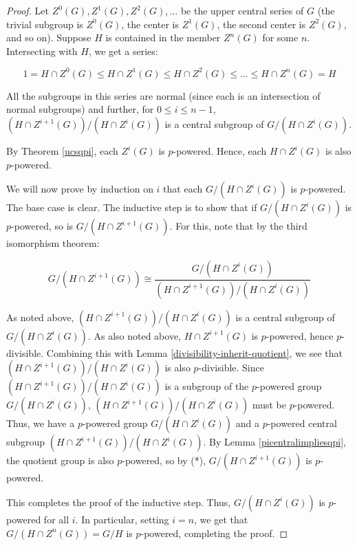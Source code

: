 \documentclass{ucetd}
\begin{document}
\begin{proof}
  Let $Z^0(G),Z^1(G),Z^2(G),\dots$ be the upper central series of $G$
  (the trivial subgroup is $Z^0(G)$, the center is $Z^1(G)$, the
  second center is $Z^2(G)$, and so on). Suppose $H$ is contained in
  the member $Z^n(G)$ for some $n$. Intersecting with $H$, we get a
  series:

  $$1 = H \cap Z^0(G) \le H \cap Z^1(G) \le H \cap Z^2(G) \le \dots \le H \cap Z^n(G) = H$$

  All the subgroups in this series are normal (since each is an
  intersection of normal subgroups) and further, for $0
  \le i \le n - 1$, $(H \cap Z^{i+1}(G))/(H \cap Z^i(G))$ is a central
  subgroup of $G/(H \cap Z^i(G))$.

  By Theorem \ref{ucsqpi}, each $Z^i(G)$ is $p$-powered. Hence, each
  $H \cap Z^i(G)$ is also $p$-powered.

  We will now prove by induction on $i$ that each $G/(H \cap Z^i(G))$
  is $p$-powered. The base case is clear. The inductive step is to
  show that if $G/(H \cap Z^i(G))$ is $p$-powered, so is $G/(H \cap
  Z^{i+1}(G))$. For this, note that by the third isomorphism theorem:

  \begin{equation*}
    G/(H \cap Z^{i+1}(G)) \cong \frac{G/(H \cap Z^i(G))}{(H \cap Z^{i+1}(G))/(H \cap Z^i(G))} \tag{*}
  \end{equation*}

  As noted above, $(H \cap Z^{i+1}(G))/(H \cap Z^i(G))$ is a central
  subgroup of $G/(H \cap Z^i(G))$. As also noted above, $H \cap
  Z^{i+1}(G)$ is $p$-powered, hence $p$-divisible. Combining this with
  Lemma \ref{divisibility-inherit-quotient}, we see that $(H \cap Z^{i+1}(G))/(H
  \cap Z^i(G))$ is also $p$-divisible. Since $(H \cap Z^{i+1}(G))/(H
  \cap Z^i(G))$ is a subgroup of the $p$-powered group $G/(H \cap
  Z^i(G))$, $(H \cap Z^{i+1}(G))/(H \cap Z^i(G))$ must be
  $p$-powered. Thus, we have a $p$-powered group $G/(H \cap Z^i(G))$
  and a $p$-powered central subgroup $(H \cap Z^{i+1}(G))/(H \cap
  Z^i(G))$. By Lemma \ref{picentralimpliesqpi}, the quotient group is
  also $p$-powered, so by (*), $G/(H \cap Z^{i+1}(G))$ is $p$-powered.

  This completes the proof of the inductive step. Thus, $G/(H \cap
  Z^i(G))$ is $p$-powered for all $i$. In particular, setting $i = n$,
  we get that $G/(H \cap Z^n(G)) = G/H$ is $p$-powered, completing the
  proof.
\end{proof}
\end{document}
